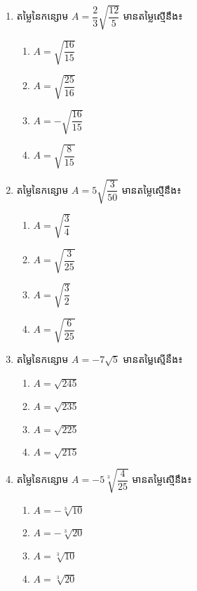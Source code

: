 \begin{enumerate}
\item តម្លៃនៃកន្សោម $A=\dfrac{2}{3}\sqrt{\dfrac{12}{5}}$ មានតម្លៃស្មើនឹង៖
\begin{multicols}{4}
\begin{enumerate}[label=\alph*.]
	\item $A=\sqrt{\dfrac{16}{15}}$
	\item $A=\sqrt{\dfrac{25}{16}}$
	\item $A=-\sqrt{\dfrac{16}{15}}$
	\item $A=\sqrt{\dfrac{8}{15}}$
\end{enumerate}
\end{multicols}

\item តម្លៃនៃកន្សោម $A=5\sqrt{\dfrac{3}{50}}$ មានតម្លៃស្មើនឹង៖
\begin{multicols}{4}
\begin{enumerate}[label=\alph*.]
	\item $A=\sqrt{\dfrac{3}{4}}$
	\item $A=\sqrt{\dfrac{3}{25}}$
	\item $A=\sqrt{\dfrac{3}{2}}$
	\item $A=\sqrt{\dfrac{6}{25}}$
\end{enumerate}
\end{multicols}

\item តម្លៃនៃកន្សោម $A=-7\sqrt{5}$ មានតម្លៃស្មើនឹង៖
\begin{multicols}{4}
\begin{enumerate}[label=\alph*.]
	\item $A=\sqrt{245}$
	\item $A=\sqrt{235}$
	\item $A=\sqrt{225}$
	\item $A=\sqrt{215}$
\end{enumerate}
\end{multicols}

\item តម្លៃនៃកន្សោម $A=-5\sqrt[3]{\dfrac{4}{25}}$ មានតម្លៃស្មើនឹង៖
\begin{multicols}{4}
\begin{enumerate}[label=\alph*.]
	\item $A=-\sqrt[3]{10}$
	\item $A=-\sqrt[3]{20}$
	\item $A=\sqrt[3]{10}$
	\item $A=\sqrt[3]{20}$
\end{enumerate}
\end{multicols}


\end{enumerate}
